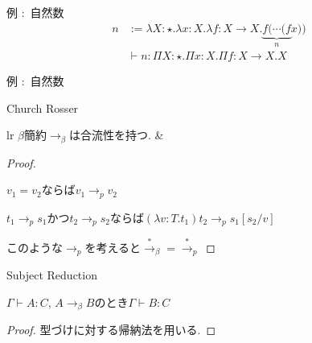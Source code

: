 \documentclass[18pt]{beamer}
\begin{document}
\begin{frame}{例 $\colon$ 自然数}
 \begin{align*}
  n & := \lambda X \colon {\star}. \lambda x \colon X. \lambda f \colon X \rightarrow X. \underbrace{f (\cdots (f}_{n} x)) \\
  &\vdash n \colon \Pi X \colon {\star}. \Pi x \colon X. \Pi f \colon X \rightarrow X. X
 \end{align*}
\end{frame}

\begin{frame}{例 $\colon$ 自然数}
 
\end{frame}

\begin{frame}[fragile]{Church Rosser}
\begin{thm}
 \begin{tabular}{lr}
 $\beta$簡約$\rightarrow_{\beta}$は合流性を持つ. &
\end{tabular}
\end{thm}
\begin{proof}
 \begin{description}
  \item $v_1 = v_2$ならば$v_1 \rightarrow_{p} v_2$
  \item $t_1 \rightarrow_{p} s_1$かつ$t_2 \rightarrow_{p} s_2$ならば$(\lambda v \colon T. t_1) t_2 \rightarrow_{p} s_1[s_2/v]$
 \end{description}
このような$\rightarrow_{p}$を考えると$\overset{*}{\rightarrow}_{\beta} = \overset{*}{\rightarrow}_{p}$
\end{proof}
\end{frame}

\begin{frame}{Subject Reduction}
\begin{thm}
 $\Gamma \vdash A \colon C$, $A \rightarrow_\beta B$のとき$\Gamma \vdash B \colon C$
\end{thm}
\begin{proof}
 型づけに対する帰納法を用いる.
\end{proof}
\end{frame}
\end{document}
